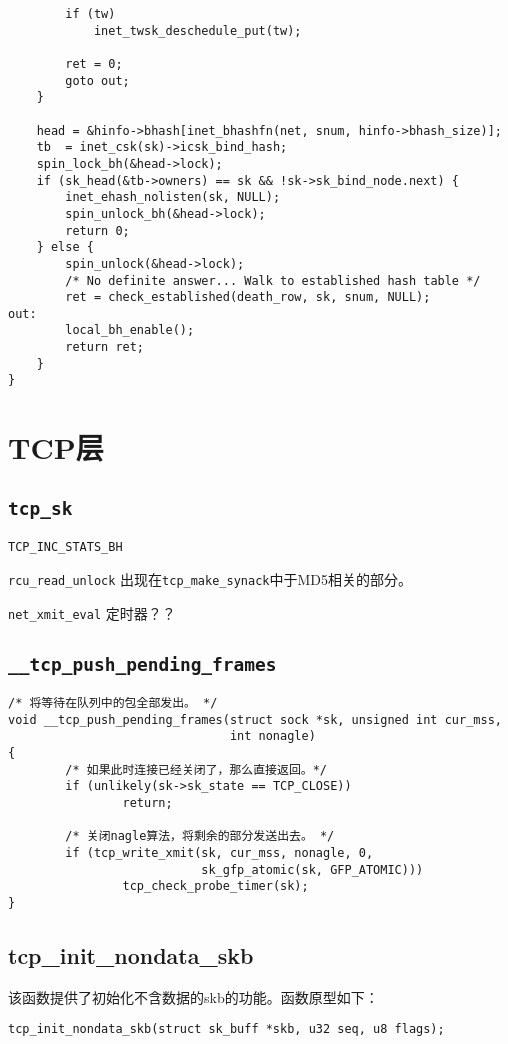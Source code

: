 \begin{verbatim}
		if (tw)
			inet_twsk_deschedule_put(tw);

		ret = 0;
		goto out;
	}

	head = &hinfo->bhash[inet_bhashfn(net, snum, hinfo->bhash_size)];
	tb  = inet_csk(sk)->icsk_bind_hash;
	spin_lock_bh(&head->lock);
	if (sk_head(&tb->owners) == sk && !sk->sk_bind_node.next) {
		inet_ehash_nolisten(sk, NULL);
		spin_unlock_bh(&head->lock);
		return 0;
	} else {
		spin_unlock(&head->lock);
		/* No definite answer... Walk to established hash table */
		ret = check_established(death_row, sk, snum, NULL);
out:
		local_bh_enable();
		return ret;
	}
}
\end{verbatim}
\section{TCP层}


    \subsection{\texttt{tcp_sk}}

    \texttt{TCP_INC_STATS_BH}

    \texttt{rcu_read_unlock} 出现在\texttt{tcp_make_synack}中于MD5相关的部分。
    
    \texttt{net_xmit_eval}   定时器？？

\subsection{\texttt{__tcp_push_pending_frames}}
\begin{verbatim}
/* 将等待在队列中的包全部发出。 */
void __tcp_push_pending_frames(struct sock *sk, unsigned int cur_mss,
                               int nonagle)
{
        /* 如果此时连接已经关闭了，那么直接返回。*/
        if (unlikely(sk->sk_state == TCP_CLOSE))
                return;

        /* 关闭nagle算法，将剩余的部分发送出去。 */
        if (tcp_write_xmit(sk, cur_mss, nonagle, 0,
                           sk_gfp_atomic(sk, GFP_ATOMIC)))
                tcp_check_probe_timer(sk);
}
\end{verbatim}

\subsection{tcp\_init\_nondata\_skb}
该函数提供了初始化不含数据的skb的功能。函数原型如下：
\begin{verbatim}
tcp_init_nondata_skb(struct sk_buff *skb, u32 seq, u8 flags);
\end{verbatim}

